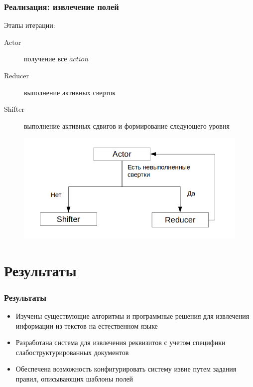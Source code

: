 \documentclass[10pt]{beamer}
\begin{document}
\begin{frame}
\frametitle{Реализация: извлечение полей}
Этапы итерации:
\begin{description}
	\item[Actor] получение все $action$
	\item[Reducer] выполнение активных сверток
	\item[Shifter] выполнение активных сдвигов и формирование следующего уровня 
\end{description}
\begin{figure}%
\centering
\includegraphics[width=\textwidth]{img/glr-iteration.png}
\end{figure}
\end{frame}

\section{Результаты}
\begin{frame}
\frametitle{Результаты}
\begin{itemize}
	\item Изучены существующие алгоритмы и программные решения для извлечения информации из текстов на естественном языке
	\item Разработана система для извлечения реквизитов с учетом специфики слабоструктурированных документов
	\item Обеспечена возможность конфигурировать систему извне путем задания правил, описывающих шаблоны полей
\end{itemize}
\end{frame}
\end{document}
